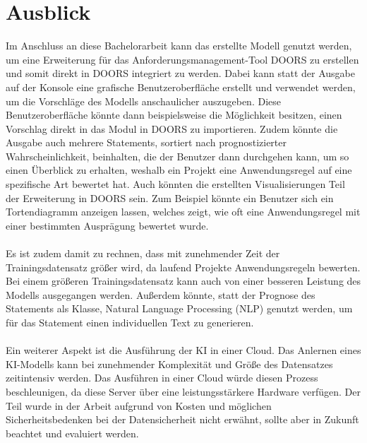 \section{Ausblick}
\label{chap:Ausblick}
Im Anschluss an diese Bachelorarbeit kann das erstellte Modell genutzt werden, um eine Erweiterung für das Anforderungsmanagement-Tool \ac{DOORS} zu erstellen
und somit direkt in \ac{DOORS} integriert zu werden.
Dabei kann statt der Ausgabe auf der Konsole eine grafische Benutzeroberfläche erstellt und verwendet werden, um die Vorschläge des Modells anschaulicher auszugeben.
Diese Benutzeroberfläche könnte dann beispielsweise die Möglichkeit besitzen, einen Vorschlag direkt in das Modul in \ac{DOORS} zu importieren. 
Zudem könnte die Ausgabe auch mehrere Statements, sortiert nach prognostizierter Wahrscheinlichkeit, beinhalten, die der Benutzer dann durchgehen kann, um so einen Überblick 
zu erhalten, weshalb ein Projekt eine Anwendungsregel auf eine spezifische Art bewertet hat. Auch könnten die erstellten Visualisierungen Teil der Erweiterung in \ac{DOORS} sein.
Zum Beispiel könnte ein Benutzer sich ein Tortendiagramm anzeigen lassen, welches zeigt, wie oft eine Anwendungsregel mit einer bestimmten Ausprägung bewertet wurde.
\\ \\
Es ist zudem damit zu rechnen, dass mit zunehmender Zeit der Trainingsdatensatz größer wird, da laufend Projekte Anwendungsregeln bewerten. Bei einem größeren Trainingsdatensatz 
kann auch von einer besseren Leistung des Modells ausgegangen werden. Außerdem könnte, statt der Prognose des Statements als Klasse, Natural Language Processing (NLP) genutzt werden, 
um für das Statement einen individuellen Text zu generieren. 
\\ \\
Ein weiterer Aspekt ist die Ausführung der \ac{KI} in einer Cloud. Das Anlernen eines \ac{KI}-Modells
kann bei zunehmender Komplexität und Größe des Datensatzes zeitintensiv werden. Das Ausführen in einer Cloud würde diesen Prozess beschleunigen,
da diese Server über eine leistungsstärkere Hardware verfügen. Der Teil wurde in der Arbeit aufgrund von 
Kosten und möglichen Sicherheitsbedenken bei der Datensicherheit nicht erwähnt, sollte aber in Zukunft beachtet und evaluiert werden. 